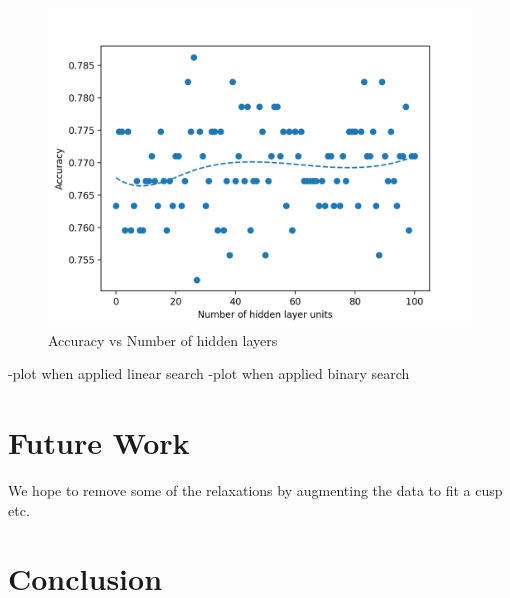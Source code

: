 \documentclass[runningheads]{llncs}
\begin{document}
\begin{figure}[H]
    \centering
    \includegraphics[width=0.8\linewidth]{figures/drexelai_binary_search_test_acc_titanic.png}
    \setlength{\belowcaptionskip}{-15pt}
    \caption{Accuracy vs Number of hidden layers}
    \label{dnadigest}
\end{figure}


-plot when applied linear search 
-plot when applied binary search 

\section{Future Work}
We hope to remove some of the relaxations by augmenting the data to fit a cusp etc.


\section{Conclusion}


%


%
\end{document}
